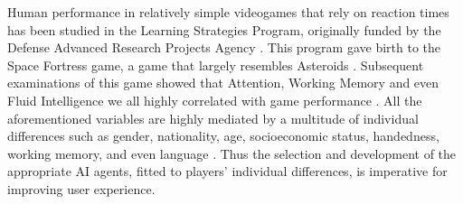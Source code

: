 Human performance in relatively simple videogames that rely on reaction times has been studied in the Learning Strategies Program, originally funded by the Defense Advanced Research Projects Agency \cite{donchin1989learning}. This program gave birth to the Space Fortress game, a game that  largely resembles Asteroids \cite{boot2015video}. Subsequent examinations of this game showed that Attention, Working Memory and even Fluid Intelligence we all highly correlated with game performance \cite{rabbitt1989space}. All the aforementioned variables are highly mediated by a multitude of individual differences such as gender, nationality, age, socioeconomic status, handedness, working memory, and even language \cite{lyle2008handedness} \cite{cazzato2010gender} \cite{stigler1986digit} \cite{templer2014relationship} \cite{greiner2014assessment}. Thus the selection and development of the appropriate AI agents, fitted to players’ individual differences, is imperative for improving user experience. 
